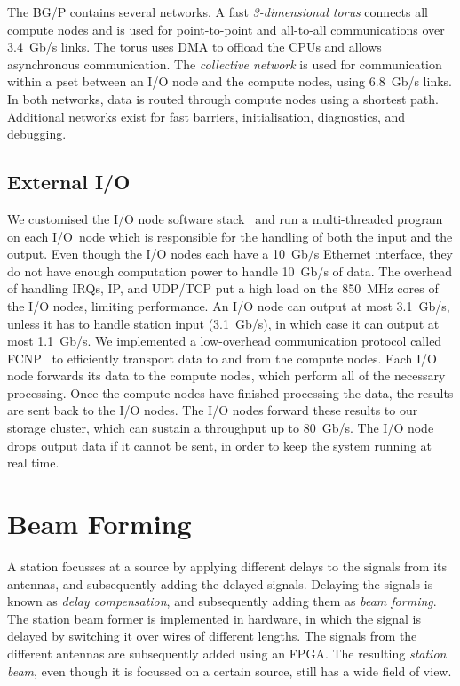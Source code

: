 \documentclass{llncs}
\begin{document}
The BG/P contains several networks. A fast \emph{3-dimensional torus\/} connects all compute nodes and is used for point-to-point and all-to-all communications over 3.4~Gb/s links. The torus uses DMA to offload the CPUs and allows asynchronous communication. The \emph{collective network\/} is used for communication within a pset between an I/O node and the compute nodes, using 6.8~Gb/s links. In both networks, data is routed through compute nodes using a shortest path. Additional networks exist for fast barriers, initialisation, diagnostics, and debugging.

\subsection{External I/O}
\label{Sec:Networks}

We customised the I/O node software stack~\cite{Yoshii:10} and run a multi-threaded program on each I/O~node which is responsible for the handling of both the input and the output. Even though the I/O nodes each have a 10~Gb/s Ethernet interface, they do not have enough computation power to handle 10~Gb/s of data. The overhead of handling IRQs, IP, and UDP/TCP put a high load on the 850~MHz cores of the I/O nodes, limiting performance. An I/O node can output at most 3.1~Gb/s, unless it has to handle station input (3.1~Gb/s), in which case it can output at most 1.1~Gb/s. We implemented a low-overhead communication protocol called FCNP~\cite{Romein:09a} to efficiently transport data to and from the compute nodes. Each I/O node forwards its data to the compute nodes, which perform all of the necessary processing. Once the compute nodes have finished processing the data, the results are sent back to the I/O nodes. The I/O nodes forward these results to our storage cluster, which can sustain a throughput up to 80~Gb/s. The I/O node drops output data if it cannot be sent, in order to keep the system running at real time.


\section{Beam Forming}
\label{Sec:Beamforming}

A station focusses at a source by applying different delays to the signals from its antennas, and subsequently adding the delayed signals. Delaying the signals is known as \emph{delay compensation}, and subsequently adding them as \emph{beam forming}. The station beam former is implemented in hardware, in which the signal is delayed by switching it over wires of different lengths. The signals from the different antennas are subsequently added using an FPGA. The resulting \emph{station beam}, even though it is focussed on a certain source, still has a wide field of view.
\end{document}
